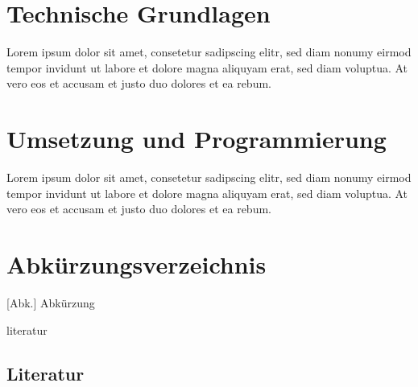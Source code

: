 \documentclass[
							a4paper, 
							11pt, 
							openany, 
							liststotoc,
							parskip=half, 
   							headings=normal
						]{scrreprt}
\begin{document}
\chapter{Technische Grundlagen} \label{ch:grundlagen}
Lorem ipsum dolor sit amet, consetetur sadipscing elitr, sed diam nonumy eirmod tempor invidunt ut labore et dolore magna aliquyam erat, sed diam voluptua. At vero eos et accusam et justo duo dolores et ea rebum.
\clearpage



\chapter{Umsetzung und Programmierung} \label{ch:umsetzung}
Lorem ipsum dolor sit amet, consetetur sadipscing elitr, sed diam nonumy eirmod tempor invidunt ut labore et dolore magna aliquyam erat, sed diam voluptua. At vero eos et accusam et justo duo dolores et ea rebum.
\clearpage



\listoffigures

\chapter*{Abkürzungsverzeichnis}
\begin{acronym}[Abk.]
 [Abk.] {Abkürzung}
\end{acronym}

\lstlistoflistings


\begin{btSect}{literatur}
\section*{Literatur}
\btPrintCited
\end{btSect}
\end{document}
